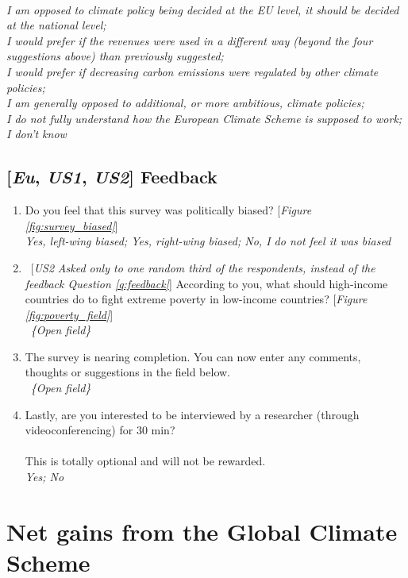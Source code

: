 \documentclass[12pt,english]{article}
\begin{document}
\begin{enumerate}[resume]
    \\ \textit{I am opposed to climate policy being decided at the EU level, it should be decided at the national level; \\I would prefer if the revenues were used in a different way (beyond the four suggestions above) than previously suggested; \\I would prefer if decreasing carbon emissions were regulated by other climate policies; \\I am generally opposed to additional, or more ambitious, climate policies; \\I do not fully understand how the European Climate Scheme is supposed to work; \\I don't know}
\end{enumerate}

\subsection*{[\textit{Eu}, \textit{US1}, \textit{US2}] Feedback}
\begin{enumerate}[resume]
\item \label{q:survey_biased} Do you feel that this survey was politically biased? [\textit{Figure \ref{fig:survey_biased}}]
\\ \textit{Yes, left-wing biased; Yes, right-wing biased; No, I do not feel it was biased}
\item \label{q:poverty_field} ~[\textit{US2} \textit{Asked only to one random third of the respondents, instead of the feedback Question \ref{q:feedback}}] According to you, what should high-income countries do to fight extreme poverty in low-income countries? [\textit{Figure \ref{fig:poverty_field}}]
\\ ~\textit{\{Open field\}}
\item \label{q:feedback} The survey is nearing completion. You can now enter any comments, thoughts or suggestions in the field below.
\\ ~\textit{\{Open field\}}
\item Lastly, are you interested to be interviewed by a researcher (through videoconferencing) for 30 min? \\
\\
This is totally optional and will not be rewarded.
\\ \textit{Yes; No}
\end{enumerate}
 

\clearpage
\section{Net gains from the Global Climate Scheme}\label{app:gain_gcs}
\end{document}
